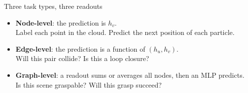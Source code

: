 \documentclass[aspectratio=169,11pt]{beamer}
\begin{document}
\begin{frame}{Three task types, three readouts}
  \vspace{0.8em}
  \begin{itemize}
    \setlength{\itemsep}{1.1em}
    \item \textbf{Node-level}: the prediction is $h_v$.\\
      {\small Label each point in the cloud. Predict the next position of each particle.}
    \item \textbf{Edge-level}: the prediction is a function of $(h_u, h_v)$.\\
      {\small Will this pair collide? Is this a loop closure?}
    \item \textbf{Graph-level}: a \alert{readout} sums or averages all nodes,
      then an MLP predicts.\\
      {\small Is this scene graspable? Will this grasp succeed?}
  \end{itemize}
\end{frame}
\end{document}
